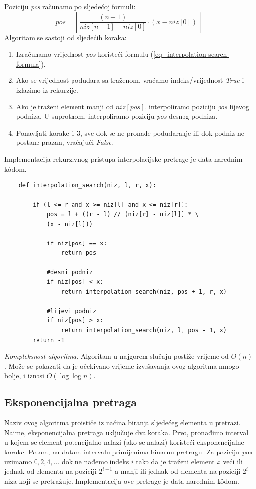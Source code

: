   Poziciju \emph{pos} računamo po sljedećoj formuli:
  \begin{equation}\label{eq_interpolation-search-formula}
     pos = \left \lfloor \frac{ (n-1)}{ niz[n-1] - niz[0]}\cdot(x - niz[0]) \right \rfloor
  \end{equation}
  Algoritam se sastoji od sljedećih koraka:
  \begin{enumerate}
  	\item  Izračunamo vrijednost \emph{pos} koristeći formulu (\ref{eq_interpolation-search-formula}).
  	\item Ako se vrijednost podudara sa traženom, vraćamo indeks/vrijednost \textit{True} i izlazimo iz rekurzije.
  	\item Ako je traženi element manji od $niz[pos]$, interpoliramo poziciju \emph{pos} lijevog podniza. U suprotnom, interpoliramo poziciju \emph{pos} desnog podniza.
  	\item Ponavljati korake 1-3, sve dok se ne pronađe podudaranje ili dok podniz ne postane prazan, vraćajući \textit{False}. 
  \end{enumerate}

Implementacija rekurzivnog pristupa interpolacijske pretrage je data narednim k\^odom. 
\begin{verbatim}
	def interpolation_search(niz, l, r, x):

		if (l <= r and x >= niz[l] and x <= niz[r]):
			pos = l + ((r - l) // (niz[r] - niz[l]) * \ 
			(x - niz[l]))
	
			if niz[pos] == x:
				return pos
	
			#desni podniz
			if niz[pos] < x:
				return interpolation_search(niz, pos + 1, r, x)
	
			#lijevi podniz
			if niz[pos] > x:
				return interpolation_search(niz, l, pos - 1, x)
		return -1
\end{verbatim}

\textit{Kompleksnost algoritma}. Algoritam u najgorem slučaju postiže vrijeme od $O(n)$.  Može se pokazati da je očekivano vrijeme izvršavanja ovog algoritma mnogo bolje, i iznosi $O(\log \log n)$.

\subsection{Eksponencijalna pretraga}

Naziv ovog algoritma proističe iz načina biranja sljedećeg elementa u pretrazi. Naime, eksponencijalna pretraga uključuje dva koraka. Prvo, pronađimo interval u kojem se element potencijalno nalazi (ako se nalazi) koristeći eksponencijalne korake. Potom, na datom intervalu primijenimo binarnu pretragu. Za  poziciju \emph{pos} uzimamo $0, 2, 4, \ldots$ dok ne nađemo indeks  $i$ tako da je traženi element $x$ veći ili jednak od elementa  na poziciji $2^{i-1}$ a manji ili jednak od elementa na poziciji $2^i$ niza koji se pretražuje. Implementacija ove pretrage je data narednim k\^odom. 
   
